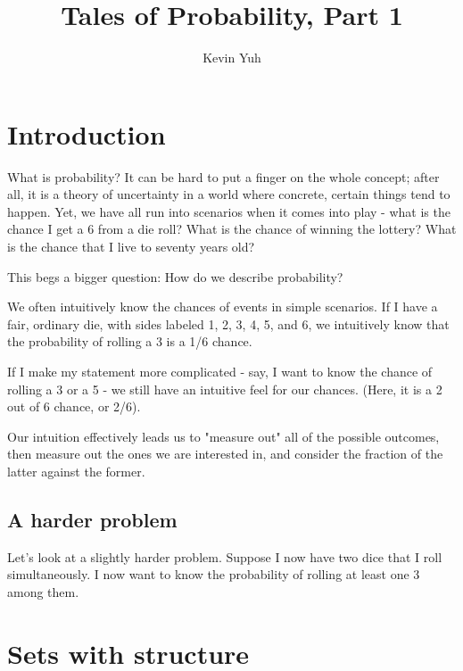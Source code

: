 \documentclass{article}
\title{Tales of Probability, Part 1}
\author{Kevin Yuh}
\begin{document}
\maketitle


\section{Introduction}

What is probability? It can be hard to put a finger on the whole concept; after all, it is a theory of uncertainty in a world where concrete, certain things tend to happen. Yet, we have all run into scenarios when it comes into play - what is the chance I get a 6 from a die roll? What is the chance of winning the lottery? What is the chance that I live to seventy years old?


This begs a bigger question: How do we describe probability? 

We often intuitively know the chances of events in simple scenarios. If I have a fair, ordinary die, with sides labeled 1, 2, 3, 4, 5, and 6, we intuitively know that the probability of rolling a 3 is a 1/6 chance. 

If I make my statement more complicated - say, I want to know the chance of rolling a 3 or a 5 - we still have an intuitive feel for our chances. (Here, it is a 2 out of 6 chance, or 2/6). 

Our intuition effectively leads us to "measure out" all of the possible outcomes, then measure out the ones we are interested in, and consider the fraction of the latter against the former. 

\subsection{A harder problem}

Let's look at a slightly harder problem. Suppose I now have two dice that I roll simultaneously. I now want to know the probability of rolling at least one 3 among them.


 


\section{Sets with structure}
\end{document}
